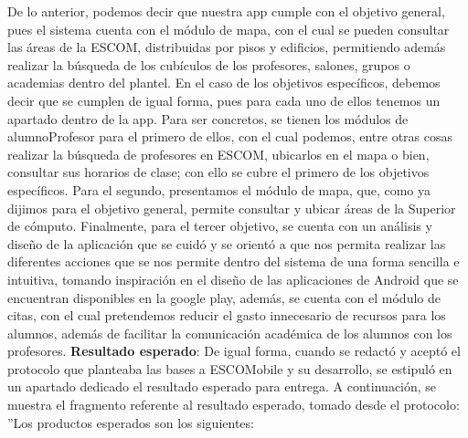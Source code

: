 De lo anterior, podemos decir que nuestra app cumple con el objetivo general, pues el sistema cuenta con el módulo de mapa, con el cual se pueden consultar las áreas de la ESCOM, distribuidas por pisos y edificios, permitiendo además realizar la búsqueda de los cubículos de los profesores, salones, grupos o academias dentro del plantel. 
\newline
En el caso de los objetivos específicos, debemos decir que se cumplen de igual forma, pues para cada uno de ellos tenemos un apartado dentro de la app. Para ser concretos, se tienen los módulos de alumnoProfesor para el primero de ellos, con el cual podemos, entre otras cosas realizar la búsqueda de profesores en ESCOM, ubicarlos en el mapa o bien, consultar sus horarios de clase; con ello se cubre el primero de los objetivos específicos. Para el segundo, presentamos el módulo de mapa, que, como ya dijimos para el objetivo general, permite consultar y ubicar áreas de la Superior de cómputo. Finalmente, para el tercer objetivo, se cuenta con un análisis y diseño de la aplicación que se cuidó y se orientó a que nos permita realizar las diferentes acciones que se nos permite dentro del sistema de una forma sencilla e intuitiva, tomando inspiración en el diseño de las aplicaciones de Android que se encuentran disponibles en la google play, además, se cuenta con el módulo de citas, con el cual pretendemos reducir el gasto innecesario de recursos para los alumnos, además de facilitar la comunicación académica de los alumnos con los profesores.
\newline
\newline
\textbf{Resultado esperado}: De igual forma, cuando se redactó y aceptó el protocolo que planteaba las bases a ESCOMobile y su desarrollo, se estipuló en un apartado dedicado el resultado esperado para entrega. A continuación, se muestra el fragmento referente al resultado esperado, tomado desde el protocolo:
\newline
''Los productos esperados son los siguientes:  
